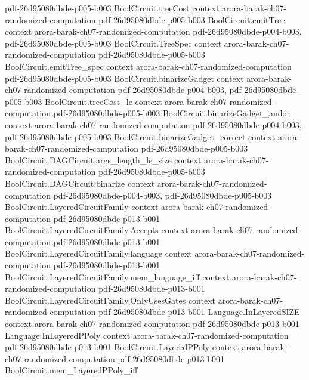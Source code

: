 \begin{theorem}
  {pdf-26d95080dbde-p005-b003}
\proofstep
  {BoolCircuit.treeCost}
  {context}
  {arora-barak-ch07-randomized-computation}
  {pdf-26d95080dbde-p005-b003}
\proofstep
  {BoolCircuit.emitTree}
  {context}
  {arora-barak-ch07-randomized-computation}
  {pdf-26d95080dbde-p004-b003,
    pdf-26d95080dbde-p005-b003}
\proofstep
  {BoolCircuit.TreeSpec}
  {context}
  {arora-barak-ch07-randomized-computation}
  {pdf-26d95080dbde-p005-b003}
\proofstep
  {BoolCircuit.emitTree_spec}
  {context}
  {arora-barak-ch07-randomized-computation}
  {pdf-26d95080dbde-p005-b003}
\proofstep
  {BoolCircuit.binarizeGadget}
  {context}
  {arora-barak-ch07-randomized-computation}
  {pdf-26d95080dbde-p004-b003,
    pdf-26d95080dbde-p005-b003}
\proofstep
  {BoolCircuit.treeCost_le}
  {context}
  {arora-barak-ch07-randomized-computation}
  {pdf-26d95080dbde-p005-b003}
\proofstep
  {BoolCircuit.binarizeGadget_andor}
  {context}
  {arora-barak-ch07-randomized-computation}
  {pdf-26d95080dbde-p004-b003,
    pdf-26d95080dbde-p005-b003}
\proofstep
  {BoolCircuit.binarizeGadget_correct}
  {context}
  {arora-barak-ch07-randomized-computation}
  {pdf-26d95080dbde-p005-b003}
\proofstep
  {BoolCircuit.DAGCircuit.args_length_le_size}
  {context}
  {arora-barak-ch07-randomized-computation}
  {pdf-26d95080dbde-p005-b003}
\proofstep
  {BoolCircuit.DAGCircuit.binarize}
  {context}
  {arora-barak-ch07-randomized-computation}
  {pdf-26d95080dbde-p004-b003,
    pdf-26d95080dbde-p005-b003}
\proofstep
  {BoolCircuit.LayeredCircuitFamily}
  {context}
  {arora-barak-ch07-randomized-computation}
  {pdf-26d95080dbde-p013-b001}
\proofstep
  {BoolCircuit.LayeredCircuitFamily.Accepts}
  {context}
  {arora-barak-ch07-randomized-computation}
  {pdf-26d95080dbde-p013-b001}
\proofstep
  {BoolCircuit.LayeredCircuitFamily.language}
  {context}
  {arora-barak-ch07-randomized-computation}
  {pdf-26d95080dbde-p013-b001}
\proofstep
  {BoolCircuit.LayeredCircuitFamily.mem_language_iff}
  {context}
  {arora-barak-ch07-randomized-computation}
  {pdf-26d95080dbde-p013-b001}
\proofstep
  {BoolCircuit.LayeredCircuitFamily.OnlyUsesGates}
  {context}
  {arora-barak-ch07-randomized-computation}
  {pdf-26d95080dbde-p013-b001}
\proofstep
  {Language.InLayeredSIZE}
  {context}
  {arora-barak-ch07-randomized-computation}
  {pdf-26d95080dbde-p013-b001}
\proofstep
  {Language.InLayeredPPoly}
  {context}
  {arora-barak-ch07-randomized-computation}
  {pdf-26d95080dbde-p013-b001}
\proofstep
  {BoolCircuit.LayeredPPoly}
  {context}
  {arora-barak-ch07-randomized-computation}
  {pdf-26d95080dbde-p013-b001}
\proofstep
  {BoolCircuit.mem_LayeredPPoly_iff}

\end{theorem}
